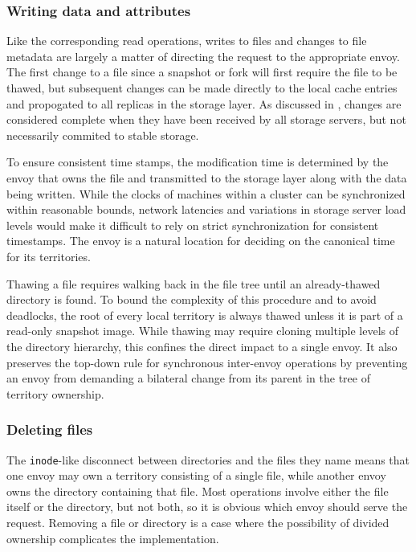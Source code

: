 \subsubsection{Writing data and attributes}

Like the corresponding read operations, writes to files and changes to file metadata are largely a matter of directing the request to the appropriate envoy. The first change to a file since a snapshot or fork will first require the file to be thawed, but subsequent changes can be made directly to the local cache entries and propogated to all replicas in the storage layer. As discussed in , changes are considered complete when they have been received by all storage servers, but not necessarily commited to stable storage.

To ensure consistent time stamps, the modification time is determined by the envoy that owns the file and transmitted to the storage layer along with the data being written. While the clocks of machines within a cluster can be synchronized within reasonable bounds, network latencies and variations in storage server load levels would make it difficult to rely on strict synchronization for consistent timestamps. The envoy is a natural location for deciding on the canonical time for its territories.

Thawing a file requires walking back in the file tree until an already-thawed directory is found. To bound the complexity of this procedure and to avoid deadlocks, the root of every local territory is always thawed unless it is part of a read-only snapshot image. While thawing may require cloning multiple levels of the directory hierarchy, this confines the direct impact to a single envoy. It also preserves the top-down rule for synchronous inter-envoy operations by preventing an envoy from demanding a bilateral change from its parent in the tree of territory ownership.

\subsubsection{Deleting files}

The \texttt{inode}-like disconnect between directories and the files they name means that one envoy may own a territory consisting of a single file, while another envoy owns the directory containing that file. Most operations involve either the file itself or the directory, but not both, so it is obvious which envoy should serve the request. Removing a file or directory is a case where the possibility of divided ownership complicates the implementation.

